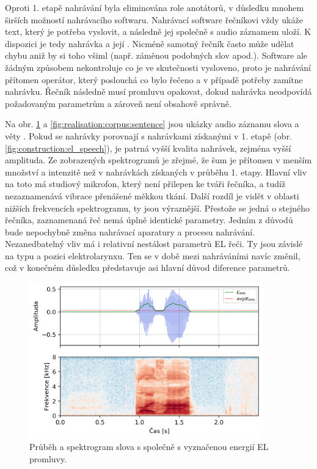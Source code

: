 Oproti 1. etapě nahrávání byla eliminována role anotátorů, v důsledku mnohem širších možností nahrávacího softwaru.
Nahrávací software řečníkovi vždy ukáže text, který je potřeba vyslovit, a následně jej společně s audio záznamem uloží.
K dispozici je tedy nahrávka a její .
Nicméně samotný řečník často může udělat chybu aniž by si toho všiml (např. záměnou podobných slov apod.).
Software ale žádným způsobem nekontroluje co je ve skutečnosti vysloveno, proto je nahrávání přítomen operátor, který poslouchá co bylo řečeno a v případě potřeby zamítne nahrávku.
Řečník následně musí promluvu opakovat, dokud nahrávka neodpovídá požadovaným parametrům a zároveň není obsahově správně.

Na obr. \ref{fig:realisation:corpus:word} a \ref{fig:realisation:corpus:sentence} jsou ukázky audio záznamu slova  a věty .
Pokud se nahrávky porovnají s nahrávkami získanými v 1. etapě (obr. \ref{fig:construction:el_speech}), je patrná vyšší kvalita nahrávek, zejména vyšší amplituda.
Ze zobrazených spektrogramů je zřejmé, že šum je přítomen v menším množství a intenzitě než v nahrávkách získaných v průběhu 1. etapy.
Hlavní vliv na toto má studiový mikrofon, který není přilepen ke tváři řečníka, a tudíž nezaznamenává vibrace přenášené měkkou tkání.
Další rozdíl je vidět v oblasti nižších frekvencích spektrogramu, ty jsou výraznější.
Přestože se jedná o stejného řečníka, zaznamenaná řeč nemá úplně identické parametry.
Jedním z důvodů bude nepochybně změna nahrávací aparatury a procesu nahrávání.
Nezanedbatelný vliv má i relativní nestálost parametrů EL řeči.
Ty jsou závislé na typu a pozici elektrolarynxu.
Ten se v době mezi nahráváními navíc změnil, což v konečném důsledku představuje asi hlavní důvod diference parametrů.

\begin{figure}[hbpt]
  \centering
  \includegraphics[width=0.9\textwidth]{./ch5-construction/img/energy_spec_word.png}
  \caption[Průběh a spektrogram slova .]{Průběh a spektrogram slova  s společně s vyznačenou energií EL promluvy.}
  \label{fig:realisation:corpus:word}
\end{figure}

